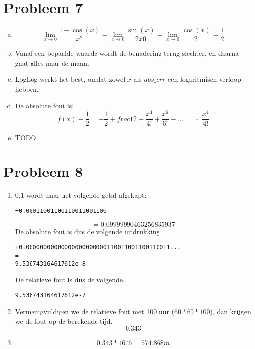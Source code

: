 \documentclass[12pt,a4paper]{article}
\begin{document}
\section{Probleem 7}
\begin{enumerate}[(a)]
\item
\[
\lim_{x \rightarrow 0} \frac{1-\cos(x)}{x^2}
= \lim_{x \rightarrow 0} \frac{\sin(x)}{2x0}
= \lim_{x \rightarrow 0} \frac{\cos(x)}{2}
= \frac{1}{2}
\]

\item
Vanaf een bepaalde waarde wordt de benadering terug slechter, en daarna gaat alles naar de maan.

\item
LogLog werkt het best, omdat zowel $x$ als $abs\_err$ een logaritmisch verloop hebben.

\item
De absolute fout is:
\[
f(x)-\frac{1}{2} = -\frac{1}{2} + frac{1}{2} - \frac{x^4}{4!} + \frac{x^6}{6!} -... = \sim\frac{x^4}{4!}
\]

\item
TODO

\end{enumerate}

\section{Probleem 8}
\begin{enumerate}
\item $0.1$ wordt naar het volgende getal afgekapt:
{\scriptsize \begin{verbatim}
+0.00011001100110011001100
\end{verbatim}}
\[
= 0.09999990463256835937
\]
De absolute fout is dus de volgende uitdrukking
{\scriptsize \begin{verbatim}
+0.00000000000000000000000110011001100110011...
=
9.536743164617612e-8
\end{verbatim}}
De relatieve fout is dus de volgende.
{\scriptsize \begin{verbatim}
9.536743164617612e-7
\end{verbatim}}

\item Vermenigvuldigen we de relatieve fout met 100 uur ($60*60*100$), dan krijgen we de fout op de berekende tijd.
\[
0.343
\]

\item
\[
0.343 * 1676 = 574.868m
\]
\end{enumerate}
\end{document}
